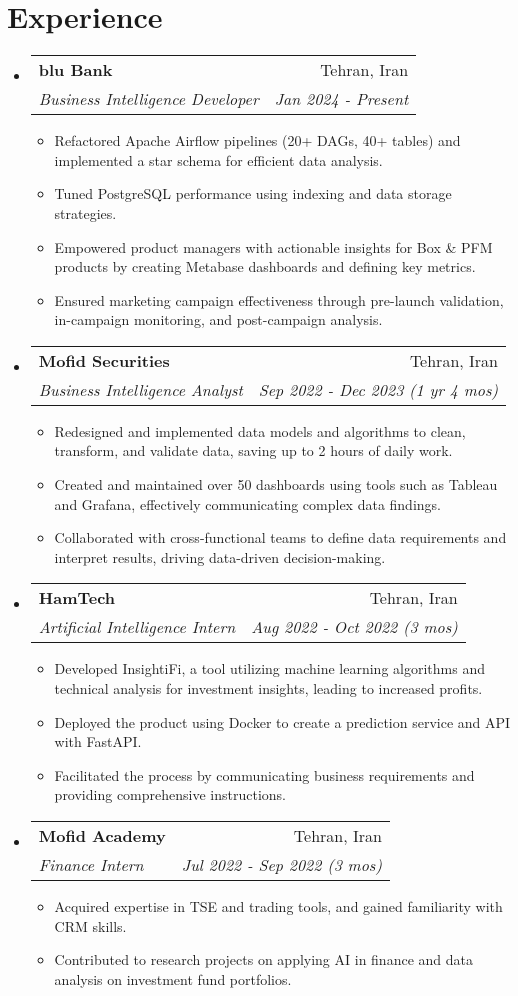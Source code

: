 \documentclass[11pt, a4paper]{article}
\makeatletter
\newcommand{\resumeItem}[1]{\item\small{#1 \vspace{-2pt}}}
\newcommand{\resumeSubheading}[4]{
    \vspace{-2pt}\item
    \begin{tabular*}{0.97\textwidth}[t]{l@{\extracolsep{\fill}}r}
        \textbf{#1} & #2 \\
        \textit{\small#3} & \textit{\small #4} \\
    \end{tabular*}\vspace{-7pt}
}
\newcommand{\resumeSubHeadingListStart}{\begin{itemize}[leftmargin=0.15in, label={}]}
\newcommand{\resumeSubHeadingListEnd}{\end{itemize}}
\newcommand{\resumeItemListStart}{\begin{itemize}}
\newcommand{\resumeItemListEnd}{\end{itemize}\vspace{-5pt}}
\makeatother
\begin{document}
\section{Experience}
\resumeSubHeadingListStart
    \resumeSubheading
        {blu Bank}{Tehran, Iran}
        {Business Intelligence Developer}{Jan 2024 - Present}
        \resumeItemListStart
            \resumeItem{Refactored Apache Airflow pipelines (20+ DAGs, 40+ tables) and implemented a star schema for efficient data analysis.}
            \resumeItem{Tuned PostgreSQL performance using indexing and data storage strategies.}
            \resumeItem{Empowered product managers with actionable insights for Box \& PFM products by creating Metabase dashboards and defining key metrics.}
            \resumeItem{Ensured marketing campaign effectiveness through pre-launch validation, in-campaign monitoring, and post-campaign analysis.}
        \resumeItemListEnd
    \resumeSubheading
        {Mofid Securities}{Tehran, Iran}
        {Business Intelligence Analyst}{Sep 2022 - Dec 2023 (1 yr 4 mos)}
        \resumeItemListStart
            \resumeItem{Redesigned and implemented data models and algorithms to clean, transform, and validate data, saving up to 2 hours of daily work.}
            \resumeItem{Created and maintained over 50 dashboards using tools such as Tableau and Grafana, effectively communicating complex data findings.}
            \resumeItem{Collaborated with cross-functional teams to define data requirements and interpret results, driving data-driven decision-making.}
        \resumeItemListEnd
    \resumeSubheading
        {HamTech}{Tehran, Iran}
        {Artificial Intelligence Intern}{Aug 2022 - Oct 2022 (3 mos)}
        \resumeItemListStart
            \resumeItem{Developed InsightiFi, a tool utilizing machine learning algorithms and technical analysis for investment insights, leading to increased profits.}
            \resumeItem{Deployed the product using Docker to create a prediction service and API with FastAPI.}
            \resumeItem{Facilitated the process by communicating business requirements and providing comprehensive instructions.}
        \resumeItemListEnd
    \resumeSubheading
        {Mofid Academy}{Tehran, Iran}
        {Finance Intern}{Jul 2022 - Sep 2022 (3 mos)}
        \resumeItemListStart
            \resumeItem{Acquired expertise in TSE and trading tools, and gained familiarity with CRM skills.}
            \resumeItem{Contributed to research projects on applying AI in finance and data analysis on investment fund portfolios.}
        \resumeItemListEnd
\resumeSubHeadingListEnd
\end{document}
